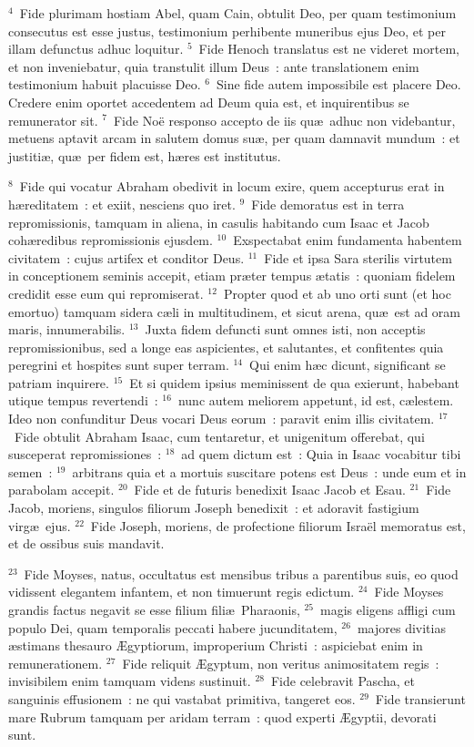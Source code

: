 ${}^{4}$~Fide plurimam hostiam Abel, quam Cain, obtulit Deo, per quam testimonium consecutus est esse justus, testimonium perhibente muneribus ejus Deo, et per illam defunctus adhuc loquitur.
${}^{5}$~Fide Henoch translatus est ne videret mortem, et non inveniebatur, quia transtulit illum Deus~: ante translationem enim testimonium habuit placuisse Deo.
${}^{6}$~Sine fide autem impossibile est placere Deo. Credere enim oportet accedentem ad Deum quia est, et inquirentibus se remunerator sit.
${}^{7}$~Fide No\"e responso accepto de iis qu\ae\ adhuc non videbantur, metuens aptavit arcam in salutem domus su\ae , per quam damnavit mundum~: et justiti\ae , qu\ae\ per fidem est, h\ae res est institutus.


${}^{8}$~Fide qui vocatur Abraham obedivit in locum exire, quem accepturus erat in h\ae reditatem~: et exiit, nesciens quo iret.
${}^{9}$~Fide demoratus est in terra repromissionis, tamquam in aliena, in casulis habitando cum Isaac et Jacob coh\ae redibus repromissionis ejusdem.
${}^{10}$~Exspectabat enim fundamenta habentem civitatem~: cujus artifex et conditor Deus.
${}^{11}$~Fide et ipsa Sara sterilis virtutem in conceptionem seminis accepit, etiam pr\ae ter tempus \ae tatis~: quoniam fidelem credidit esse eum qui repromiserat.
${}^{12}$~Propter quod et ab uno orti sunt (et hoc emortuo) tamquam sidera c\ae li in multitudinem, et sicut arena, qu\ae\ est ad oram maris, innumerabilis.
${}^{13}$~Juxta fidem defuncti sunt omnes isti, non acceptis repromissionibus, sed a longe eas aspicientes, et salutantes, et confitentes quia peregrini et hospites sunt super terram.
${}^{14}$~Qui enim h\ae c dicunt, significant se patriam inquirere.
${}^{15}$~Et si quidem ipsius meminissent de qua exierunt, habebant utique tempus revertendi~:
${}^{16}$~nunc autem meliorem appetunt, id est, c\ae lestem. Ideo non confunditur Deus vocari Deus eorum~: paravit enim illis civitatem.
${}^{17}$~Fide obtulit Abraham Isaac, cum tentaretur, et unigenitum offerebat, qui susceperat repromissiones~:
${}^{18}$~ad quem dictum est~: Quia in Isaac vocabitur tibi semen~:
${}^{19}$~arbitrans quia et a mortuis suscitare potens est Deus~: unde eum et in parabolam accepit.
${}^{20}$~Fide et de futuris benedixit Isaac Jacob et Esau.
${}^{21}$~Fide Jacob, moriens, singulos filiorum Joseph benedixit~: et adoravit fastigium virg\ae\ ejus.
${}^{22}$~Fide Joseph, moriens, de profectione filiorum Isra\"el memoratus est, et de ossibus suis mandavit.


${}^{23}$~Fide Moyses, natus, occultatus est mensibus tribus a parentibus suis, eo quod vidissent elegantem infantem, et non timuerunt regis edictum.
${}^{24}$~Fide Moyses grandis factus negavit se esse filium fili\ae\ Pharaonis,
${}^{25}$~magis eligens affligi cum populo Dei, quam temporalis peccati habere jucunditatem,
${}^{26}$~majores divitias \ae stimans thesauro \AE gyptiorum, improperium Christi~: aspiciebat enim in remunerationem.
${}^{27}$~Fide reliquit \AE gyptum, non veritus animositatem regis~: invisibilem enim tamquam videns sustinuit.
${}^{28}$~Fide celebravit Pascha, et sanguinis effusionem~: ne qui vastabat primitiva, tangeret eos.
${}^{29}$~Fide transierunt mare Rubrum tamquam per aridam terram~: quod experti \AE gyptii, devorati sunt.


